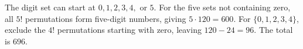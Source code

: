 The digit set can start at $0,1,2,3,4,$ or $5$. For the five sets not containing zero, all $5!$ permutations form five-digit numbers, giving $5\cdot120=600$. For $\{0,1,2,3,4\}$, exclude the $4!$ permutations starting with zero, leaving $120-24=96$. The total is $\boxed{696}$.
